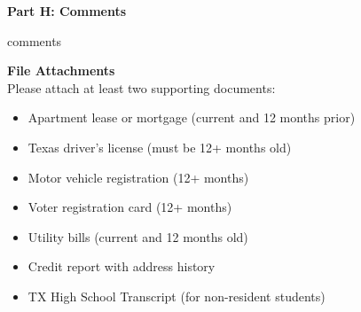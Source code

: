 \documentclass[12pt]{article}
\begin{document}
\textbf{Part H: Comments} \\[5pt]
\begin{minipage}{1.0\textwidth}
\begin{framed}
{{ comments }}
\end{framed}
\end{minipage}

\textbf{File Attachments} \\[5pt]
Please attach at least two supporting documents:
\begin{itemize}
    \item Apartment lease or mortgage (current and 12 months prior)
    \item Texas driver's license (must be 12+ months old)
    \item Motor vehicle registration (12+ months)
    \item Voter registration card (12+ months)
    \item Utility bills (current and 12 months old)
    \item Credit report with address history
    \item TX High School Transcript (for non-resident students)
\end{itemize}
\end{document}
